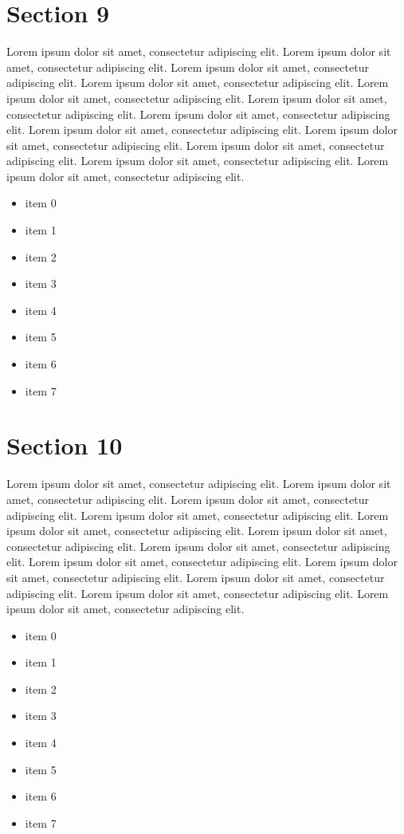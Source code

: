 \documentclass{article}
\begin{document}
\section{Section 9}
Lorem ipsum dolor sit amet, consectetur adipiscing elit. Lorem ipsum dolor sit amet, consectetur adipiscing elit. Lorem ipsum dolor sit amet, consectetur adipiscing elit. Lorem ipsum dolor sit amet, consectetur adipiscing elit. Lorem ipsum dolor sit amet, consectetur adipiscing elit. Lorem ipsum dolor sit amet, consectetur adipiscing elit. Lorem ipsum dolor sit amet, consectetur adipiscing elit. Lorem ipsum dolor sit amet, consectetur adipiscing elit. Lorem ipsum dolor sit amet, consectetur adipiscing elit. Lorem ipsum dolor sit amet, consectetur adipiscing elit. Lorem ipsum dolor sit amet, consectetur adipiscing elit. Lorem ipsum dolor sit amet, consectetur adipiscing elit. 
\begin{itemize}
\item item 0
\item item 1
\item item 2
\item item 3
\item item 4
\item item 5
\item item 6
\item item 7
\end{itemize}

\section{Section 10}
Lorem ipsum dolor sit amet, consectetur adipiscing elit. Lorem ipsum dolor sit amet, consectetur adipiscing elit. Lorem ipsum dolor sit amet, consectetur adipiscing elit. Lorem ipsum dolor sit amet, consectetur adipiscing elit. Lorem ipsum dolor sit amet, consectetur adipiscing elit. Lorem ipsum dolor sit amet, consectetur adipiscing elit. Lorem ipsum dolor sit amet, consectetur adipiscing elit. Lorem ipsum dolor sit amet, consectetur adipiscing elit. Lorem ipsum dolor sit amet, consectetur adipiscing elit. Lorem ipsum dolor sit amet, consectetur adipiscing elit. Lorem ipsum dolor sit amet, consectetur adipiscing elit. Lorem ipsum dolor sit amet, consectetur adipiscing elit. 
\begin{itemize}
\item item 0
\item item 1
\item item 2
\item item 3
\item item 4
\item item 5
\item item 6
\item item 7
\end{itemize}
\end{document}
